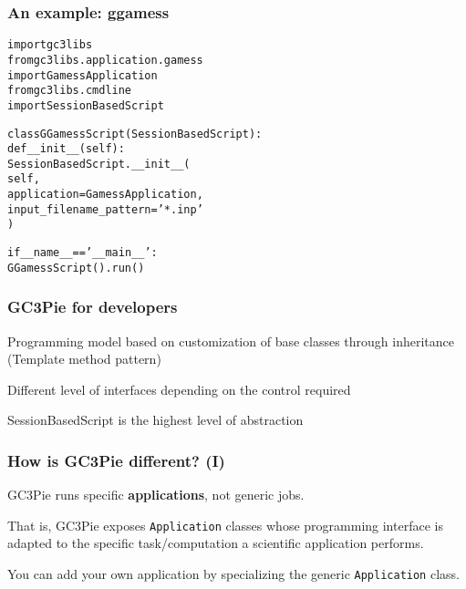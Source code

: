\documentclass[english,serif,mathserif,xcolor=pdftex,dvipsnames,table]{beamer}
\begin{document}
\begin{frame}[fragile]
  \frametitle{An example: ggamess}
  \begin{alltt}
import gc3libs
from gc3libs.application.gamess 
     {\color{Blue}import} GamessApplication
from gc3libs.cmdline 
     {\color{Blue}import} SessionBasedScript

class {\color{Violet} GGamessScript}({\color{Violet}SessionBasedScript}):
  def \_\_init\_\_(self):
    SessionBasedScript.\_\_init\_\_(
       self,
       application = {\color{Violet}GamessApplication},
       input_filename_pattern = '{\color{Green}*.inp}'
    )
             
if \_\_name\_\_ == '{\color{Green}\_\_main\_\_}':
  GGamessScript().{\color{Blue}run()}
\end{alltt}
\end{frame}



\begin{frame}
  \frametitle{GC3Pie for developers}
    \begin{block}{}
      Programming model based on customization of base classes through
      inheritance ({\color{Blue}Template method} pattern)
    \end{block}
    
    \begin{block}{}
      Different level of {\color{Blue}interfaces} depending on the control required
    \end{block}

    \begin{block}{}
      {\color{Blue}SessionBasedScript} is the highest level of abstraction
    \end{block}
\end{frame}

\begin{frame}
  \frametitle{How is GC3Pie different? (I)}
  
  \begin{block}{}
    GC3Pie runs specific \textbf{applications}, not generic jobs.
  \end{block}
  
   \begin{block}{}
     That is, GC3Pie exposes \texttt{Application} classes whose programming
    interface is adapted to the specific task/computation a scientific
    application performs.
  \end{block}
    
  \begin{block}{}
    You can add your own application by specializing the generic
    \texttt{Application} class.
  \end{block}
\end{frame}
\end{document}
